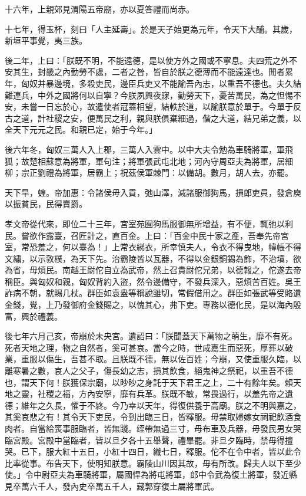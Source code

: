 \begin{pinyinscope}
十六年，上親郊見渭陽五帝廟，亦以夏答禮而尚赤。

十七年，得玉杯，刻曰「人主延壽」。於是天子始更為元年，令天下大酺。其歲，新垣平事覺，夷三族。

後二年，上曰：「朕既不明，不能遠德，是以使方外之國或不寧息。夫四荒之外不安其生，封畿之內勤勞不處，二者之咎，皆自於朕之德薄而不能遠達也。閒者累年，匈奴并暴邊境，多殺吏民，邊臣兵吏又不能諭吾內志，以重吾不德也。夫久結難連兵，中外之國將何以自寧？今朕夙興夜寐，勤勞天下，憂苦萬民，為之怛惕不安，未嘗一日忘於心，故遣使者冠蓋相望，結軼於道，以諭朕意於單于。今單于反古之道，計社稷之安，便萬民之利，親與朕俱棄細過，偕之大道，結兄弟之義，以全天下元元之民。和親已定，始于今年。」

後六年冬，匈奴三萬人入上郡，三萬人入雲中。以中大夫令勉為車騎將軍，軍飛狐；故楚相蘇意為將軍，軍句注；將軍張武屯北地；河內守周亞夫為將軍，居細柳；宗正劉禮為將軍，居霸上；祝茲侯軍棘門：以備胡。數月，胡人去，亦罷。

天下旱，蝗。帝加惠：令諸侯毋入貢，弛山澤，減諸服御狗馬，損郎吏員，發倉庾以振貧民，民得賣爵。

孝文帝從代來，即位二十三年，宮室苑囿狗馬服御無所增益，有不便，輒弛以利民。嘗欲作露臺，召匠計之，直百金。上曰：「百金中民十家之產，吾奉先帝宮室，常恐羞之，何以臺為！」上常衣綈衣，所幸慎夫人，令衣不得曳地，幃帳不得文繡，以示敦樸，為天下先。治霸陵皆以瓦器，不得以金銀銅錫為飾，不治墳，欲為省，毋煩民。南越王尉佗自立為武帝，然上召貴尉佗兄弟，以德報之，佗遂去帝稱臣。與匈奴和親，匈奴背約入盜，然令邊備守，不發兵深入，惡煩苦百姓。吳王詐病不朝，就賜几杖。群臣如袁盎等稱說雖切，常假借用之。群臣如張武等受賂遺金錢，覺，上乃發御府金錢賜之，以愧其心，弗下吏。專務以德化民，是以海內殷富，興於禮義。

後七年六月己亥，帝崩於未央宮。遺詔曰：「朕聞蓋天下萬物之萌生，靡不有死。死者天地之理，物之自然者，奚可甚哀。當今之時，世咸嘉生而惡死，厚葬以破業，重服以傷生，吾甚不取。且朕既不德，無以佐百姓；今崩，又使重服久臨，以離寒暑之數，哀人之父子，傷長幼之志，損其飲食，絕鬼神之祭祀，以重吾不德也，謂天下何！朕獲保宗廟，以眇眇之身託于天下君王之上，二十有餘年矣。賴天地之靈，社稷之福，方內安寧，靡有兵革。朕既不敏，常畏過行，以羞先帝之遺德；維年之久長，懼于不終。今乃幸以天年，得復供養于高廟。朕之不明與嘉之，其奚哀悲之有！其令天下吏民，令到出臨三日，皆釋服。毋禁取婦嫁女祠祀飲酒食肉者。自當給喪事服臨者，皆無踐。绖帶無過三寸，毋布車及兵器，毋發民男女哭臨宮殿。宮殿中當臨者，皆以旦夕各十五舉聲，禮畢罷。非旦夕臨時，禁毋得擅哭。已下，服大紅十五日，小紅十四日，纖七日，釋服。佗不在令中者，皆以此令比率從事。布告天下，使明知朕意。霸陵山川因其故，毋有所改。歸夫人以下至少使。」令中尉亞夫為車騎將軍，屬國悍為將屯將軍，郎中令武為復土將軍，發近縣見卒萬六千人，發內史卒萬五千人，藏郭穿復土屬將軍武。


\end{pinyinscope}
